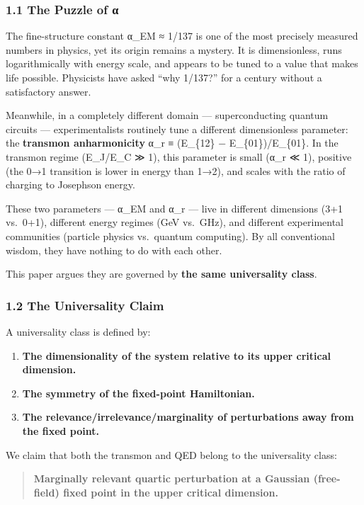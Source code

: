 \documentclass[
]{article}
\providecommand{\tightlist}{%
  \setlength{\itemsep}{0pt}\setlength{\parskip}{0pt}}
\begin{document}
\subsubsection{1.1 The Puzzle of α}\label{the-puzzle-of-ux3b1}

The fine-structure constant α\_EM ≈ 1/137 is one of the most precisely
measured numbers in physics, yet its origin remains a mystery. It is
dimensionless, runs logarithmically with energy scale, and appears to be
tuned to a value that makes life possible. Physicists have asked ``why
1/137?'' for a century without a satisfactory answer.

Meanwhile, in a completely different domain --- superconducting quantum
circuits --- experimentalists routinely tune a different dimensionless
parameter: the \textbf{transmon anharmonicity} α\_r ≡ (E\_\{12\} −
E\_\{01\})/E\_\{01\}. In the transmon regime (E\_J/E\_C ≫ 1), this
parameter is small (α\_r ≪ 1), positive (the 0→1 transition is lower in
energy than 1→2), and scales with the ratio of charging to Josephson
energy.

These two parameters --- α\_EM and α\_r --- live in different dimensions
(3+1 vs.~0+1), different energy regimes (GeV vs.~GHz), and different
experimental communities (particle physics vs.~quantum computing). By
all conventional wisdom, they have nothing to do with each other.

This paper argues they are governed by \textbf{the same universality
class}.

\subsubsection{1.2 The Universality Claim}\label{the-universality-claim}

A universality class is defined by:

\begin{enumerate}
\def\labelenumi{\arabic{enumi}.}
\tightlist
\item
  \textbf{The dimensionality of the system relative to its upper
  critical dimension.}
\item
  \textbf{The symmetry of the fixed-point Hamiltonian.}
\item
  \textbf{The relevance/irrelevance/marginality of perturbations away
  from the fixed point.}
\end{enumerate}

We claim that both the transmon and QED belong to the universality
class:

\begin{quote}
\textbf{Marginally relevant quartic perturbation at a Gaussian
(free-field) fixed point in the upper critical dimension.}
\end{quote}
\end{document}
